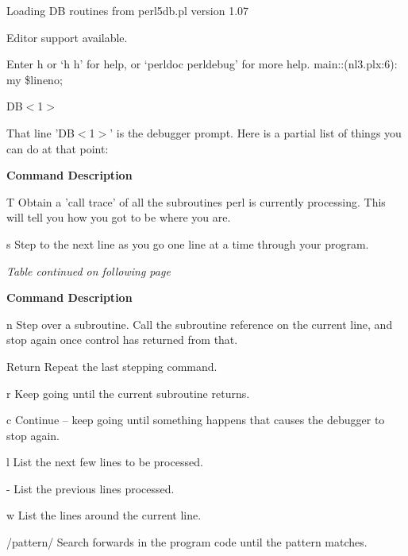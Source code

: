 \documentclass[a4paper,11pt]{book}
\begin{document}
\noindent Loading DB routines from perl5db.pl version 1.07

\noindent Editor support available.

\noindent Enter h or `h h' for help, or `perldoc perldebug' for more help. main::(nl3.plx:6): my \$lineno;

\noindent DB$<$1$>$

\noindent 

\noindent That line 'DB$<$1$>$' is the debugger prompt. Here is a partial list of things you can do at that point:

\noindent 

\noindent \textbf{Command Description}

\noindent 

\noindent T Obtain a 'call trace' of all the subroutines perl is currently processing. This will tell you how you got to be where you are.

\noindent s Step to the next line as you go one line at a time through your program.

\noindent \textit{Table continued on following page}

\noindent 

\noindent 

\noindent \textbf{Command Description}

\noindent 

\noindent n Step over a subroutine. Call the subroutine reference on the current line, and stop again once control has returned from that.

\noindent Return Repeat the last stepping command.

\noindent 

\noindent r Keep going until the current subroutine returns.

\noindent 

\noindent c Continue -- keep going until something happens that causes the debugger to stop again.

\noindent l List the next few lines to be processed.

\noindent 

\noindent - List the previous lines processed.

\noindent 

\noindent w List the lines around the current line.

\noindent 

\noindent /pattern/ Search forwards in the program code until the pattern matches.

\noindent 
\end{document}
